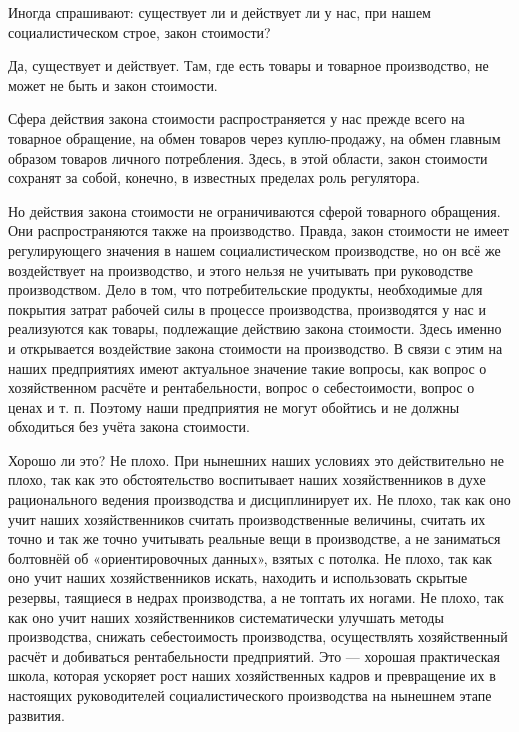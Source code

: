 \documentclass[12pt, a4paper, openany]{book}
\begin{document}
Иногда спрашивают: существует ли и действует ли у нас, при нашем социалистическом строе, закон стоимости?

Да, существует и действует. Там, где есть товары и товарное производство, не может не быть и закон стоимости.

Сфера действия закона стоимости распространяется у нас прежде всего на товарное обращение, на обмен товаров через куплю-продажу, на обмен главным образом товаров личного потребления. Здесь, в этой области, закон стоимости сохранят за собой, конечно, в известных пределах роль регулятора.

Но действия закона стоимости не ограничиваются сферой товарного обращения. Они распространяются также на производство. Правда, закон стоимости не имеет регулирующего значения в нашем социалистическом производстве, но он всё же воздействует на производство, и этого нельзя не учитывать при руководстве производством. Дело в том, что потребительские продукты, необходимые для покрытия затрат рабочей силы в процессе производства, производятся у нас и реализуются как товары, подлежащие действию закона стоимости. Здесь именно и открывается воздействие закона стоимости на производство. В связи с этим на наших предприятиях имеют актуальное значение такие вопросы, как вопрос о хозяйственном расчёте и рентабельности, вопрос о себестоимости, вопрос о ценах и т. п. Поэтому наши предприятия не могут обойтись и не должны обходиться без учёта закона стоимости.

Хорошо ли это? Не плохо. При нынешних наших условиях это действительно не плохо, так как это обстоятельство воспитывает наших хозяйственников в духе рационального ведения производства и дисциплинирует их. Не плохо, так как оно учит наших хозяйственников считать производственные величины, считать их точно и так же точно учитывать реальные вещи в производстве, а не заниматься болтовнёй об «ориентировочных данных», взятых с потолка. Не плохо, так как оно учит наших хозяйственников искать, находить и использовать скрытые резервы, таящиеся в недрах производства, а не топтать их ногами. Не плохо, так как оно учит наших хозяйственников систематически улучшать методы производства, снижать себестоимость производства, осуществлять хозяйственный расчёт и добиваться рентабельности предприятий. Это — хорошая практическая школа, которая ускоряет рост наших хозяйственных кадров и превращение их в настоящих руководителей социалистического производства на нынешнем этапе развития.
\end{document}

